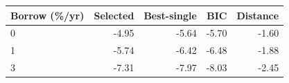\begin{tabular}{@{}lrrrr@{}}
\toprule
Borrow (\%/yr) & Selected & Best-single & BIC & Distance \\
\midrule
0 & -4.95 & -5.64 & -5.70 & -1.60 \\
1 & -5.74 & -6.42 & -6.48 & -1.88 \\
3 & -7.31 & -7.97 & -8.03 & -2.45 \\
\bottomrule
\end{tabular}
